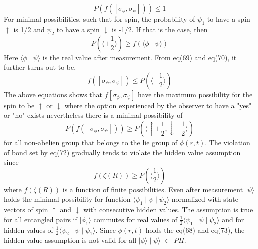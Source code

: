 \documentclass{article}
\begin{document}
 \begin{equation}
      P(f([\sigma_\phi , \sigma_\psi])) \leq 1 
 \end{equation} For minimal possibilities, such that for spin, the probability of $\psi_1$ to have a spin $\uparrow$ is 1/2 and $\psi_2$ to have a spin $\downarrow$ is -1/2. If that is the case, then
 \begin{equation}
P(\langle \pm \frac{1}{2} \rangle ) \geq f(\langle \phi \mid \psi \rangle) 
 \end{equation} Here $\langle \phi \mid \psi \rangle$ is the real value after measurement. From eq(69) and eq(70), it further turns out to be,
 \begin{equation}
   f([\sigma_\phi , \sigma_\psi]) \leq P(\langle \pm \frac{1}{2} \rangle ) 
 \end{equation} The above equations shows that \begin{math}
  f[\sigma_\phi, \sigma_\psi] 
 \end{math} have the maximum possibility for the spin to be $\uparrow$ or $\downarrow$ where the option experienced by the observer to have a "yes" or "no" exists nevertheless there is a minimal possibility of \begin{equation}
      P( f([\sigma_\phi , \sigma_\psi]) ) \geq P(\langle \uparrow +\frac{1}{2} , \downarrow -\frac{1}{2} \rangle) 
 \end{equation} for all non-abelien group that belongs to the lie group of $\phi(r,t)$. The violation of bond set by eq(72) gradually tends to violate the hidden value assumption since \begin{equation}
f(\zeta (R)) \geq P(\langle \frac{1}{2} \rangle) 
 \end{equation} where $f(\zeta (R) )$ is a function of finite possibilities. Even after measurement $\mid \psi \rangle$ holds the minimal possibility for function $\langle \psi_1 \mid \psi \mid \psi_2 \rangle$ normalized with state vectors of spin $\uparrow$ and $\downarrow$ with consecutive hidden values. The assumption is true for all entangled pairs if $\mid \phi_1 \rangle$ commutes for real values of $\frac{1}{2} \langle \psi_1 \mid  \psi \mid  \psi_2 \rangle$ and for hidden values of $\frac{1}{2} \langle \psi_2 \mid  \psi \mid  \psi_1 \rangle$. Since $\phi (r,t)$ holds the eq(68) and eq(73), the hidden value assumption is not valid for all $\mid \phi \rangle \mid \psi \rangle$ $\in$ $PH$. 
\end{document}
